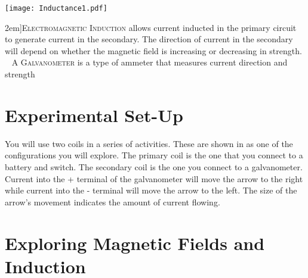 \begin{figure*}
	\vspace{2em}
	\centering	\label{f:induction-galvanometer}
	\texttt{[image: Inductance1.pdf]}
	\caption[Electromagnetic Induction][2em]{\textsc{Electromagnetic Induction} allows current inducted in the primary circuit to generate current in the secondary.  The direction of current in the secondary will depend on whether the magnetic field is increasing or decreasing in strength. \newline~ \newline A \textsc{Galvanometer} is a type of ammeter that measures current direction and strength}
\end{figure*}



\section{Experimental Set-Up}
You will use two coils in a series of activities.  These are shown in  as one of the configurations you will explore.  The primary coil is the one that you connect to a battery and switch.  The secondary coil is the one you connect to a galvanometer.  Current into the + terminal of the galvanometer will move the arrow to the right while current into the - terminal will move the arrow to the left.  The size of the arrow's movement indicates the amount of current flowing.




\section{Exploring Magnetic Fields and Induction}

